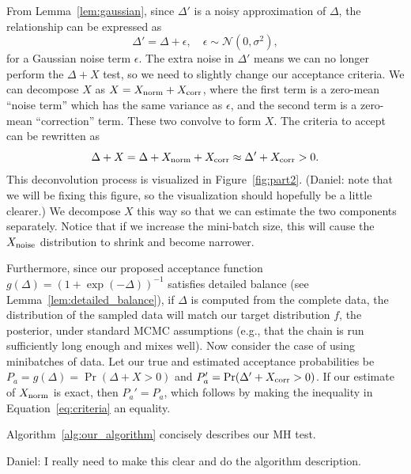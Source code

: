 \documentclass{article}
\begin{document}
From Lemma~\ref{lem:gaussian}, since $\Delta'$ is a noisy approximation of $\Delta$, the
relationship can be expressed as
\begin{equation}\label{eq:relationship}
\Delta' = \Delta + \epsilon, \quad \epsilon \sim \mathcal{N}(0, \sigma^2),
\end{equation}
for a Gaussian noise term $\epsilon$.  The extra noise in $\Delta'$ means we can no longer perform
the $\Delta + X$ test, so we need to slightly change our acceptance criteria. We can decompose
$X$ as $X = X_{\rm norm}+X_{\rm corr}$, where the first term is a zero-mean ``noise term'' which
has the same variance as $\epsilon$, and the second term is a zero-mean ``correction'' term.
These two convolve to form $X$. The criteria to accept can be rewritten as
\begin{equation}\label{eq:criteria}
\Delta + X = \Delta + X_{\rm norm} + X_{\rm corr} \approx \Delta' + X_{\rm corr} >0.
\end{equation}
This deconvolution process is visualized in Figure~\ref{fig:part2}. {\color{blue} (Daniel: note that
we will be fixing this figure, so the visualization should hopefully be a little clearer.)} We
decompose $X$ this way so that we can estimate the two components separately.  Notice that if we
increase the mini-batch size, this will cause the $X_{\rm noise}$ distribution to shrink and become
narrower.

Furthermore, since our proposed acceptance function $g(\Delta) = (1+ \exp(-\Delta))^{-1}$ satisfies
detailed balance (see Lemma~\ref{lem:detailed_balance}), if $\Delta$ is computed from the complete
data, the distribution of the sampled data will match our target distribution $f$, the posterior,
under standard MCMC assumptions (e.g., that the chain is run sufficiently long enough and mixes
well). Now consider the case of using minibatches of data. Let our true and estimated acceptance
probabilities be $P_a = g(\Delta) = \Pr(\Delta + X > 0)$ and $P_a' = \Pr(\Delta' + X_{\rm corr} >
0)$.  If our estimate of $X_{\rm norm}$ is exact, then $P_a' = P_a$, which follows by making the
inequality in Equation~\ref{eq:criteria} an equality.

Algorithm~\ref{alg:our_algorithm} concisely describes our MH test.

{\color{blue}
Daniel: I really need to make this clear and do the algorithm description.
}
\end{document}

